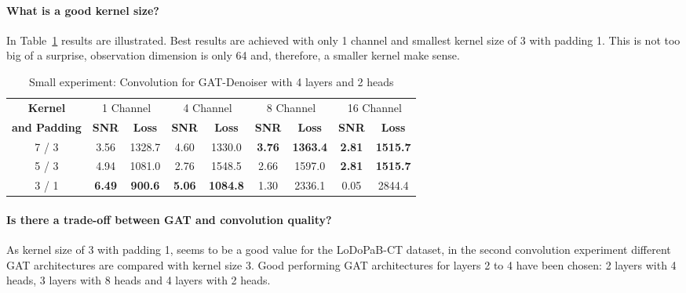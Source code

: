 \paragraph{What is a good kernel size?}

In Table~\ref{tab:small_convolution} results are illustrated. 
Best results are achieved with only 1 channel and smallest kernel size of 3 with padding 1.
This is not too big of a surprise, observation dimension is only 64 and, therefore, a smaller kernel make sense.


\begin{table}[H]
  \centering
  \begin{tabular}{c|cc|cc|cc|cc}
    \toprule
    \textbf{Kernel}  & \multicolumn{2}{c|}{1 Channel} & \multicolumn{2}{c|}{4 Channel} & \multicolumn{2}{c|}{8 Channel} & \multicolumn{2}{c}{16 Channel} \\
    \textbf{and Padding}  & \textbf{SNR} & \textbf{Loss} & \textbf{SNR} & \textbf{Loss} & \textbf{SNR} & \textbf{Loss} & \textbf{SNR} & \textbf{Loss} \\ 
    \midrule
      7 / 3 & 3.56 & 1328.7                  & 4.60  &  1330.0                   & \textbf{3.76} & \textbf{1363.4} & \textbf{2.81}  & \textbf{1515.7} \\ \hline
      5 / 3 & 4.94 & 1081.0                  & 2.76  &  1548.5                   & 2.66 & 1597.0                   & \textbf{2.81}  & \textbf{1515.7} \\ \hline
      3 / 1 & \textbf{6.49} & \textbf{900.6} & \textbf{5.06}  &  \textbf{1084.8} & 1.30 & 2336.1                   & 0.05  & 2844.4 \\

    \midrule
  \end{tabular}

  \caption{Small experiment: Convolution for GAT-Denoiser with 4 layers and 2 heads}
  \label{tab:small_convolution}
\end{table}

\paragraph{Is there a trade-off between GAT and convolution quality?}

As kernel size of 3 with padding 1, seems to be a good value for the LoDoPaB-CT dataset, 
in the second convolution experiment different GAT architectures are compared with kernel size 3.
Good performing GAT architectures for layers 2 to 4 have been chosen: 2 layers with 4 heads, 3 layers with 8 heads
and 4 layers with 2 heads.


